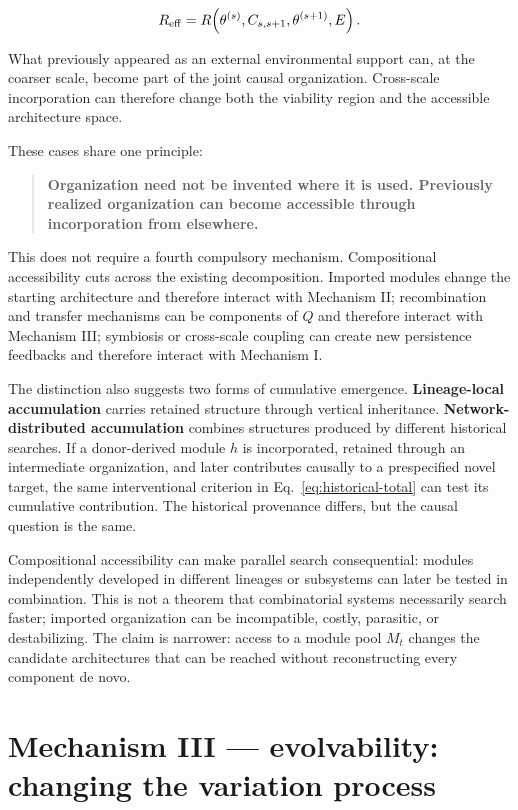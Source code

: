 \documentclass[11pt,a4paper]{article}
\begin{document}
\[
R_{\rm eff}=R\!\left(\theta^{(s)},C_{s,s+1},\theta^{(s+1)},E\right).
\]

What previously appeared as an external environmental support can, at the coarser scale, become part of the joint causal organization. Cross-scale incorporation can therefore change both the viability region and the accessible architecture space.

These cases share one principle:

\begin{quote}
\textbf{Organization need not be invented where it is used. Previously realized organization can become accessible through incorporation from elsewhere.}
\end{quote}

This does not require a fourth compulsory mechanism. Compositional accessibility cuts across the existing decomposition. Imported modules change the starting architecture and therefore interact with Mechanism II; recombination and transfer mechanisms can be components of $Q$ and therefore interact with Mechanism III; symbiosis or cross-scale coupling can create new persistence feedbacks and therefore interact with Mechanism I.

The distinction also suggests two forms of cumulative emergence. \textbf{Lineage-local accumulation} carries retained structure through vertical inheritance. \textbf{Network-distributed accumulation} combines structures produced by different historical searches. If a donor-derived module $h$ is incorporated, retained through an intermediate organization, and later contributes causally to a prespecified novel target, the same interventional criterion in Eq.~\eqref{eq:historical-total} can test its cumulative contribution. The historical provenance differs, but the causal question is the same.

Compositional accessibility can make parallel search consequential: modules independently developed in different lineages or subsystems can later be tested in combination. This is not a theorem that combinatorial systems necessarily search faster; imported organization can be incompatible, costly, parasitic, or destabilizing. The claim is narrower: access to a module pool $M_t$ changes the candidate architectures that can be reached without reconstructing every component de novo.

\section{Mechanism III --- evolvability: changing the variation process}
\end{document}
